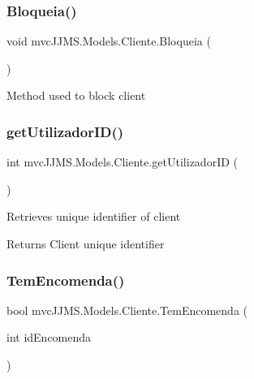 \subsubsection{\texorpdfstring{Bloqueia()}{Bloqueia()}}
{\footnotesize\ttfamily void mvc\+J\+J\+M\+S.\+Models.\+Cliente.\+Bloqueia (\begin{DoxyParamCaption}{ }\end{DoxyParamCaption})\hspace{0.3cm}{\ttfamily [inline]}}



Method used to block client 

\mbox{\label{classmvc_j_j_m_s_1_1_models_1_1_cliente_af711f052377f6684bc93ac4886d20a78}} 
\subsubsection{\texorpdfstring{get\+Utilizador\+I\+D()}{getUtilizadorID()}}
{\footnotesize\ttfamily int mvc\+J\+J\+M\+S.\+Models.\+Cliente.\+get\+Utilizador\+ID (\begin{DoxyParamCaption}{ }\end{DoxyParamCaption})\hspace{0.3cm}{\ttfamily [inline]}}



Retrieves unique identifier of client 

\begin{DoxyReturn}{Returns}
Client unique identifier
\end{DoxyReturn}
\mbox{\label{classmvc_j_j_m_s_1_1_models_1_1_cliente_a1071410f6080091b9996277cba83f0b4}} 
\subsubsection{\texorpdfstring{Tem\+Encomenda()}{TemEncomenda()}}
{\footnotesize\ttfamily bool mvc\+J\+J\+M\+S.\+Models.\+Cliente.\+Tem\+Encomenda (\begin{DoxyParamCaption}\item[{int}]{id\+Encomenda }\end{DoxyParamCaption})\hspace{0.3cm}{\ttfamily [inline]}}




